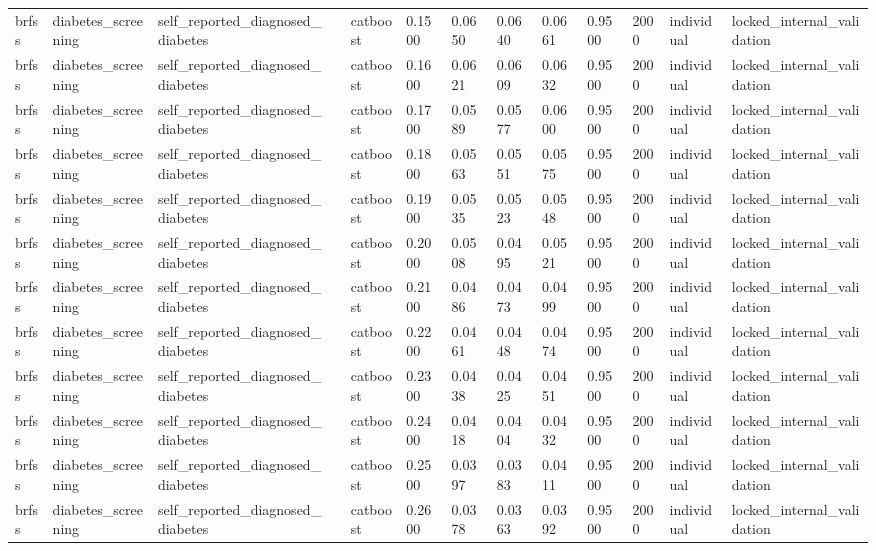 \begin{tabular}{lllllllllllll}
brfss & diabetes\_screening & self\_reported\_diagnosed\_diabetes &  & catboost & 0.1500 & 0.0650 & 0.0640 & 0.0661 & 0.9500 & 2000 & individual & locked\_internal\_validation \\
brfss & diabetes\_screening & self\_reported\_diagnosed\_diabetes &  & catboost & 0.1600 & 0.0621 & 0.0609 & 0.0632 & 0.9500 & 2000 & individual & locked\_internal\_validation \\
brfss & diabetes\_screening & self\_reported\_diagnosed\_diabetes &  & catboost & 0.1700 & 0.0589 & 0.0577 & 0.0600 & 0.9500 & 2000 & individual & locked\_internal\_validation \\
brfss & diabetes\_screening & self\_reported\_diagnosed\_diabetes &  & catboost & 0.1800 & 0.0563 & 0.0551 & 0.0575 & 0.9500 & 2000 & individual & locked\_internal\_validation \\
brfss & diabetes\_screening & self\_reported\_diagnosed\_diabetes &  & catboost & 0.1900 & 0.0535 & 0.0523 & 0.0548 & 0.9500 & 2000 & individual & locked\_internal\_validation \\
brfss & diabetes\_screening & self\_reported\_diagnosed\_diabetes &  & catboost & 0.2000 & 0.0508 & 0.0495 & 0.0521 & 0.9500 & 2000 & individual & locked\_internal\_validation \\
brfss & diabetes\_screening & self\_reported\_diagnosed\_diabetes &  & catboost & 0.2100 & 0.0486 & 0.0473 & 0.0499 & 0.9500 & 2000 & individual & locked\_internal\_validation \\
brfss & diabetes\_screening & self\_reported\_diagnosed\_diabetes &  & catboost & 0.2200 & 0.0461 & 0.0448 & 0.0474 & 0.9500 & 2000 & individual & locked\_internal\_validation \\
brfss & diabetes\_screening & self\_reported\_diagnosed\_diabetes &  & catboost & 0.2300 & 0.0438 & 0.0425 & 0.0451 & 0.9500 & 2000 & individual & locked\_internal\_validation \\
brfss & diabetes\_screening & self\_reported\_diagnosed\_diabetes &  & catboost & 0.2400 & 0.0418 & 0.0404 & 0.0432 & 0.9500 & 2000 & individual & locked\_internal\_validation \\
brfss & diabetes\_screening & self\_reported\_diagnosed\_diabetes &  & catboost & 0.2500 & 0.0397 & 0.0383 & 0.0411 & 0.9500 & 2000 & individual & locked\_internal\_validation \\
brfss & diabetes\_screening & self\_reported\_diagnosed\_diabetes &  & catboost & 0.2600 & 0.0378 & 0.0363 & 0.0392 & 0.9500 & 2000 & individual & locked\_internal\_validation \\

\end{tabular}
